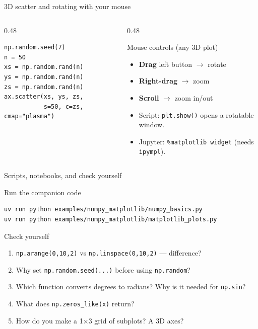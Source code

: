 \documentclass[aspectratio=169]{beamer}
\begin{document}
\begin{frame}[fragile]{3D scatter and rotating with your mouse}
  \begin{columns}[T]
    \begin{column}{0.48\textwidth}
      \begin{lstlisting}
np.random.seed(7)
n = 50
xs = np.random.rand(n)
ys = np.random.rand(n)
zs = np.random.rand(n)
ax.scatter(xs, ys, zs,
           s=50, c=zs, cmap="plasma")
      \end{lstlisting}
    \end{column}
    \begin{column}{0.48\textwidth}
      \begin{block}{Mouse controls (any 3D plot)}
        \begin{itemize}
          \item \textbf{Drag} left button $\rightarrow$ rotate
          \item \textbf{Right-drag} $\rightarrow$ zoom
          \item \textbf{Scroll} $\rightarrow$ zoom in/out
        \end{itemize}
      \end{block}
      \begin{itemize}
        \item Script: \texttt{plt.show()} opens a rotatable window.
        \item Jupyter: \texttt{\%matplotlib widget} (needs \texttt{ipympl}).
      \end{itemize}
    \end{column}
  \end{columns}
\end{frame}

\begin{frame}[fragile]{Scripts, notebooks, and check yourself}
  \begin{block}{Run the companion code}
    \begin{lstlisting}
uv run python examples/numpy_matplotlib/numpy_basics.py
uv run python examples/numpy_matplotlib/matplotlib_plots.py
    \end{lstlisting}
  \end{block}
  \begin{block}{Check yourself}
    \begin{enumerate}
      \item \texttt{np.arange(0,10,2)} vs \texttt{np.linspace(0,10,2)} --- difference?
      \item Why set \texttt{np.random.seed(...)} before using \texttt{np.random}?
      \item Which function converts degrees to radians? Why is it needed for \texttt{np.sin}?
      \item What does \texttt{np.zeros\_like(x)} return?
      \item How do you make a 1$\times$3 grid of subplots? A 3D axes?
    \end{enumerate}
  \end{block}
\end{frame}
\end{document}
